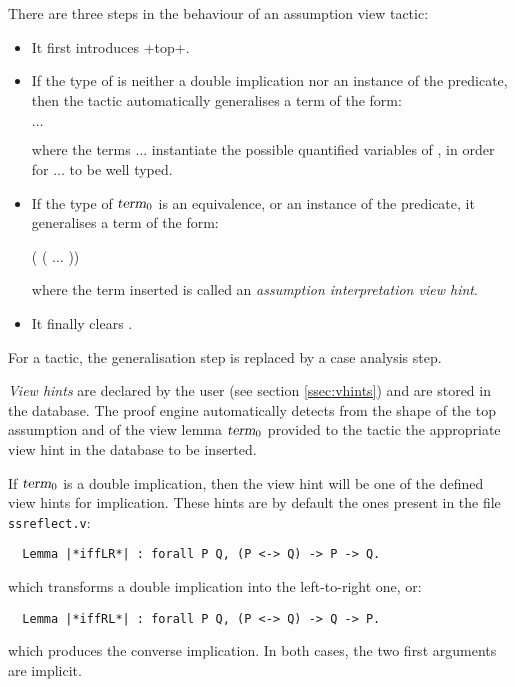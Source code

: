 There are three steps in the behaviour of an assumption view tactic:
\begin{itemize}
\item It first introduces \ssrL+top+.
\item If the type of  is neither a double implication nor
  an instance of the  predicate, then the tactic
  automatically generalises a term of the form:

\begin{center}
  \ssrC{(}  $\dots$ \ssrC{)}
\end{center}

  where the terms  $\dots$  instantiate the
  possible quantified variables of , in order for
  \ssrC{(}  $\dots$   to be well typed.
\item If the type of $\ssrN[0]{term}$ is an equivalence, or
  an instance of the  predicate, it generalises a term of
  the form:
  \begin{center}
  ( (  $\dots$ ))
  \end{center}
  where the term  inserted is called an
  \emph{assumption interpretation view hint}.
\item It finally clears .
\end{itemize}
For a  tactic, the generalisation step is
replaced by a case analysis step.

\emph{View hints} are declared by the user (see section
\ref{ssec:vhints}) and are stored in the  database.
The proof engine automatically
detects from the shape of the top assumption  and of the view
lemma $\ssrN[0]{term}$ provided to the tactic the appropriate view hint in
the database to be inserted.

If $\ssrN[0]{term}$ is a double implication, then the view hint  will
be one of the defined view hints for implication. These hints are by
default the ones present in the file {\tt ssreflect.v}:
\begin{lstlisting}
  Lemma |*iffLR*| : forall P Q, (P <-> Q) -> P -> Q.
\end{lstlisting}
which transforms a double  implication into the left-to-right one, or:
\begin{lstlisting}
  Lemma |*iffRL*| : forall P Q, (P <-> Q) -> Q -> P.
\end{lstlisting}
which produces the converse implication. In both cases, the two first
 arguments are implicit.

